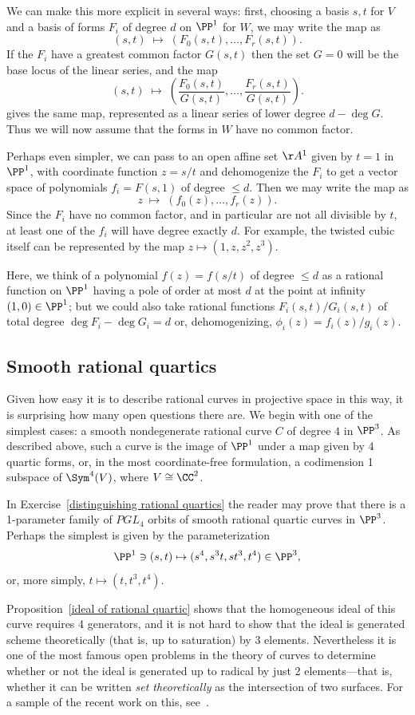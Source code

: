 We can make this more explicit in several ways: first, choosing a basis $s,t$ for $V$ and a basis of forms $F_i$ of degree $d$ on $\PP^1$ for $W$, we may write the map as
$$
(s,t) \; \mapsto \; \left(F_0(s,t), \dots, F_r(s,t)\right).
$$
If the $F_i$ have a greatest common factor $G(s,t)$ then the set $G=0$ will be the base locus
of the linear series, and the map
$$
(s,t) \; \mapsto \; \left( \frac{F_0(s,t)}{G(s,t)}, \dots, \frac{F_r(s,t)}{G(s,t)}\right).
$$
gives the same map, represented as a linear series of lower degree $d-\deg G$. Thus we
will now assume that the forms in $W$ have no common factor.

Perhaps even simpler, we can pass to an open affine set $\AA^1$ given by $t=1$ in $\PP^1$, with coordinate function $z = s/t$ and
dehomogenize the $F_i$ to get a vector space of polynomials $f_i = F(s,1)$ of degree $\leq d$. Then we may write the
map as
$$
z \; \mapsto \; (f_0(z), \dots, f_r(z)).
$$
Since the $F_i$ have no common factor, and in particular are not all divisible by $t$, at least one of the
$f_i$ will have degree exactly $d$.
For example, the twisted cubic itself can be represented by the map
$z \mapsto (1, z,z^2,z^3)$.

Here, we think of a polynomial $f(z) = f(s/t)$ of degree $\leq d$ as a rational function on $\PP^1$ having
a pole of order at most $d$ at the point at infinity $(1,0)\in \PP^1$; but we could also take rational
functions $F_i(s,t)/G_i(s,t)$ of total degree $\deg F_i-\deg G_i = d$ or, dehomogenizing, $\phi_i(z) = f_i(z)/g_i(z)$.

\subsection *{Smooth rational quartics}
Given how easy it is to describe rational curves in projective space in this way, it is surprising how many open questions there are. We begin with
one of the simplest cases: a smooth nondegenerate rational curve $C$ of degree $4$ in $\PP^3$.
As described above, such a curve is the image of $\PP^1$ under a map given by 4 quartic forms,
or, in the most coordinate-free formulation, a codimension 1 subspace of $\Sym^4(V)$, where
$V\cong \CC^2$. 

\begin{example}
In Exercise~\ref{distinguishing rational quartics} the reader may prove that there is a 1-parameter family of 
$PGL_4$ orbits of smooth rational quartic curves in $\PP^3$. Perhaps the simplest is given by the parameterization 
$$
\PP^1 \ni (s,t) \mapsto (s^4, s^3t, st^3, t^4)\in \PP^3,
$$
or, more simply, $t\mapsto(t, t^3, t^4)$. 

Proposition~\ref{ideal of rational quartic} shows that the homogeneous ideal of this curve requires 4 generators, and it is not hard to show
that the ideal is generated scheme theoretically (that is, up to saturation) by 3 elements. Nevertheless it is
one of the most famous open problems in the theory of curves to determine whether or not the ideal
is generated up to radical by just 2 elements---that is, whether it
can be written \emph{set theoretically} as the intersection of two surfaces. For a sample of the recent
work on this, see~\cite{MR3356940}. 
\end{example}

